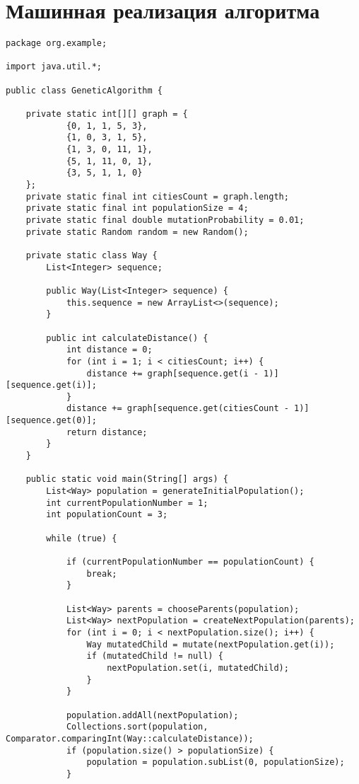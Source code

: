 \documentclass{article}
\begin{document}
\section*{Машинная реализация алгоритма}

\begin{lstlisting}[caption={GeneticAlgorithm}, breaklines=true, linewidth=\textwidth]
package org.example;

import java.util.*;

public class GeneticAlgorithm {

    private static int[][] graph = {
            {0, 1, 1, 5, 3},
            {1, 0, 3, 1, 5},
            {1, 3, 0, 11, 1},
            {5, 1, 11, 0, 1},
            {3, 5, 1, 1, 0}
    };
    private static final int citiesCount = graph.length;
    private static final int populationSize = 4;
    private static final double mutationProbability = 0.01;
    private static Random random = new Random();

    private static class Way {
        List<Integer> sequence;

        public Way(List<Integer> sequence) {
            this.sequence = new ArrayList<>(sequence);
        }

        public int calculateDistance() {
            int distance = 0;
            for (int i = 1; i < citiesCount; i++) {
                distance += graph[sequence.get(i - 1)][sequence.get(i)];
            }
            distance += graph[sequence.get(citiesCount - 1)][sequence.get(0)];
            return distance;
        }
    }

    public static void main(String[] args) {
        List<Way> population = generateInitialPopulation();
        int currentPopulationNumber = 1;
        int populationCount = 3;

        while (true) {

            if (currentPopulationNumber == populationCount) {
                break;
            }

            List<Way> parents = chooseParents(population);
            List<Way> nextPopulation = createNextPopulation(parents);
            for (int i = 0; i < nextPopulation.size(); i++) {
                Way mutatedChild = mutate(nextPopulation.get(i));
                if (mutatedChild != null) {
                    nextPopulation.set(i, mutatedChild);
                }
            }

            population.addAll(nextPopulation);
            Collections.sort(population, Comparator.comparingInt(Way::calculateDistance));
            if (population.size() > populationSize) {
                population = population.subList(0, populationSize);
            }


\end{lstlisting}
\end{document}

